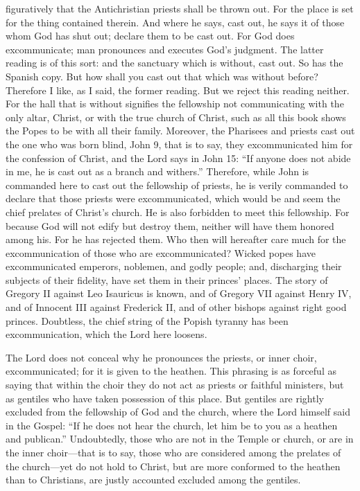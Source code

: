 figuratively that the Antichristian priests shall be thrown out. For the place is set for the thing contained therein. And where he says, cast out, he says it of those whom God has shut out; declare them to be cast out. For God does excommunicate; man pronounces and executes God’s judgment. The latter reading is of this sort: and the sanctuary which is without, cast out. So has the Spanish copy. But how shall you cast out that which was without before? Therefore I like, as I said, the former reading. But we reject this reading neither. For the hall that is without signifies the fellowship not communicating with the only altar, Christ, or with the true church of Christ, such as all this book shows the Popes to be with all their family. Moreover, the Pharisees and priests cast out the one who was born blind, John 9, that is to say, they excommunicated him for the confession of Christ, and the Lord says in John 15: “If anyone does not abide in me, he is cast out as a branch and withers.” Therefore, while John is commanded here to cast out the fellowship of priests, he is verily commanded to declare that those priests were excommunicated, which would be and seem the chief prelates of Christ’s church. He is also forbidden to meet this fellowship. For because God will not edify but destroy them, neither will have them honored among his. For he has rejected them. Who then will hereafter care much for the excommunication of those who are excommunicated? Wicked popes have excommunicated emperors, noblemen, and godly people; and, discharging their subjects of their fidelity, have set them in their princes’ places. The story of Gregory II against Leo Isauricus is known, and of Gregory VII against Henry IV, and of Innocent III against Frederick II, and of other bishops against right good princes. Doubtless, the chief string of the Popish tyranny has been excommunication, which the Lord here loosens.

The Lord does not conceal why he pronounces the priests, or inner choir, excommunicated; for it is given to the heathen. This phrasing is as forceful as saying that within the choir they do not act as priests or faithful ministers, but as gentiles who have taken possession of this place. But gentiles are rightly excluded from the fellowship of God and the church, where the Lord himself said in the Gospel: “If he does not hear the church, let him be to you as a heathen and publican.” Undoubtedly, those who are not in the Temple or church, or are in the inner choir—that is to say, those who are considered among the prelates of the church—yet do not hold to Christ, but are more conformed to the heathen than to Christians, are justly accounted excluded among the gentiles.

